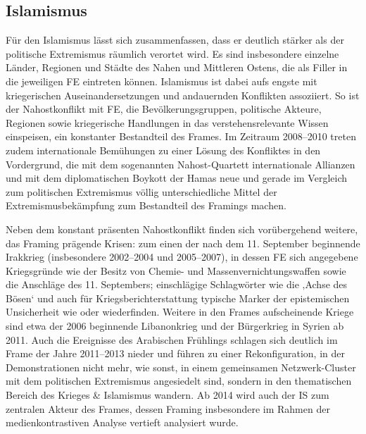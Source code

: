 \subsection{Islamismus}\label{islamismus-11}

Für den Islamismus lässt sich zusammenfassen, dass er deutlich stärker als der politische Extremismus räumlich verortet wird. Es sind insbesondere einzelne Länder, Regionen und Städte des Nahen und Mittleren Ostens, die als Filler in die jeweiligen FE eintreten können. Islamismus ist dabei aufs engste mit kriegerischen Auseinandersetzungen und andauernden Konflikten assoziiert. So ist der Nahostkonflikt mit FE, die Bevölkerungsgruppen, politische Akteure, Regionen sowie kriegerische Handlungen in das verstehensrelevante Wissen einspeisen, ein konstanter Bestandteil des Frames. Im Zeitraum 2008--2010 treten zudem internationale Bemühungen zu einer Lösung des Konfliktes in den Vordergrund, die mit dem sogenannten Nahost-Quartett internationale Allianzen und mit dem diplomatischen Boykott der Hamas neue und gerade im Vergleich zum politischen Extremismus völlig unterschiedliche Mittel der Extremismusbekämpfung zum Bestandteil des Framings machen.

Neben dem konstant präsenten Nahostkonflikt finden sich vorübergehend weitere, das Framing prägende Krisen: zum einen der nach dem 11. September beginnende Irakkrieg (insbesondere 2002--2004 und 2005--2007), in dessen FE sich angegebene Kriegsgründe wie der Besitz von Chemie- und Massenvernichtungswaffen sowie die Anschläge des 11. Septembers; einschlägige Schlagwörter wie die ‚Achse des Bösen` und auch für Kriegsberichterstattung typische Marker der epistemischen Unsicherheit wie  oder  wiederfinden. Weitere in den Frames aufscheinende Kriege sind etwa der 2006 beginnende Libanonkrieg und der Bürgerkrieg in Syrien ab 2011. Auch die Ereignisse des Arabischen Frühlings schlagen sich deutlich im Frame der Jahre 2011--2013 nieder und führen zu einer Rekonfiguration, in der Demonstrationen nicht mehr, wie sonst, in einem gemeinsamen Netzwerk-Cluster mit dem politischen Extremismus angesiedelt sind, sondern in den thematischen Bereich des Krieges \& Islamismus wandern. Ab 2014 wird auch der IS zum zentralen Akteur des Frames, dessen Framing insbesondere im Rahmen der medienkontrastiven Analyse vertieft analysiert wurde.

